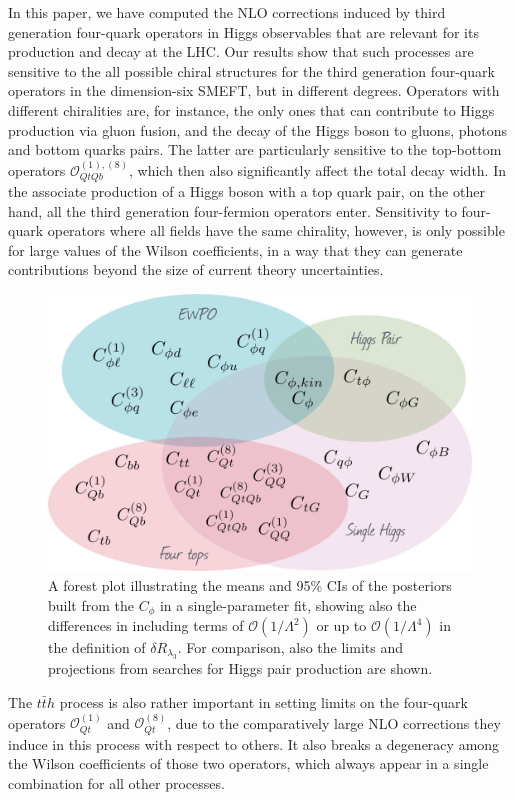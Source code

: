 In this paper, we have computed the NLO corrections induced by third generation four-quark operators in Higgs observables that are relevant for its production and decay at the LHC. 
Our results show that such processes are sensitive to the all possible chiral structures for the third generation four-quark operators in the dimension-six SMEFT, but in different degrees. 
Operators with different chiralities are, for instance, the only ones that can contribute to Higgs production via gluon fusion, and the decay of the Higgs boson to gluons, photons and bottom quarks pairs.  The latter are particularly sensitive to the top-bottom operators $\mathcal{O}_{QtQb}^{(1),(8)}$, which then also significantly affect the total decay width. In the associate production of a Higgs boson with a top quark pair, on the other hand, all the third generation four-fermion operators enter.
Sensitivity to four-quark operators where all fields have the same chirality, however, is only possible for large values of the Wilson coefficients, in a way that they can generate contributions beyond the size of current theory uncertainties. 
%
\begin{figure}
	\begin{center}
		\includegraphics[width=0.75\linewidth]{figures/SMEFT_collection}
	\end{center}
	\caption{A forest plot illustrating the means and 95\% CIs of the posteriors built from the  $C_\phi$  in a single-parameter fit, showing also the differences in including terms of $\mathcal{O}(1/\Lambda^2)$ or up to $\mathcal{O}(1/\Lambda^4)$ in the definition of $\delta R_{\lambda_3}$. For comparison, also the limits and projections from searches for Higgs pair production are shown.  \label{fig:summcphihl-lhc}  }
\end{figure}
The $t\bar{t}h$ process is also rather important in setting limits on the four-quark operators $\mathcal{O}_{Qt}^{(1)}$ and $\mathcal{O}_{Qt}^{(8)}$, due to the comparatively large NLO corrections they induce in this process with respect to others. It also breaks a degeneracy among the Wilson coefficients of those two operators, which always appear in a single combination for all other processes. 
